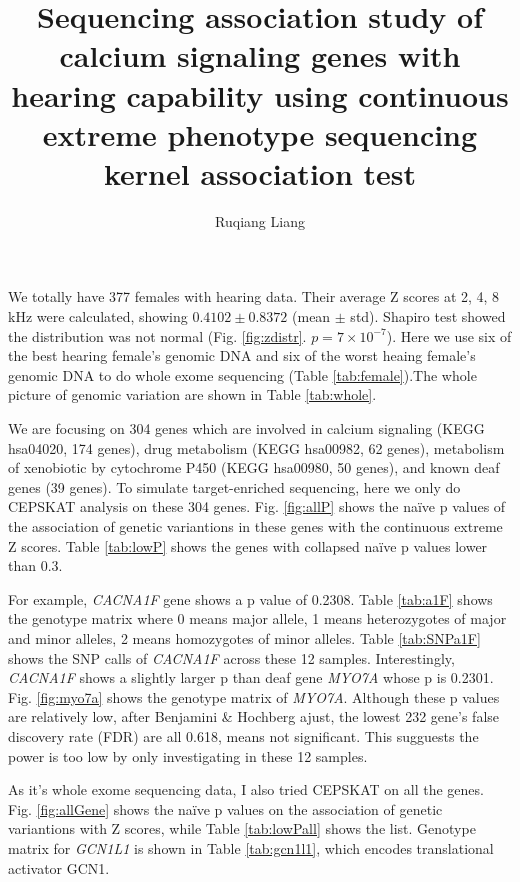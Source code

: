 \documentclass{article}
\begin{document}


\title{Sequencing association study of calcium signaling genes with hearing capability using continuous extreme phenotype sequencing kernel association test}
\author{Ruqiang Liang}
\maketitle

We totally have 377 females with hearing data. Their average Z scores at 2, 4, 8 kHz were calculated, showing $0.4102 \pm 0.8372$ (mean $\pm$ std). Shapiro test showed the distribution was not normal (Fig. \ref{fig:zdistr}. $p = 7 \times 10^{-7}$). Here we use six of the best hearing female's genomic DNA and six of the worst heaing female's genomic DNA to do whole exome sequencing (Table \ref{tab:female}).The whole picture of genomic variation are shown in Table \ref{tab:whole}.

We are focusing on 304 genes which are involved in calcium signaling (KEGG hsa04020, 174 genes), drug metabolism (KEGG hsa00982, 62 genes), metabolism of xenobiotic by cytochrome P450 (KEGG hsa00980, 50 genes), and known deaf genes (39 genes). To simulate target-enriched sequencing, here we only do CEPSKAT analysis on these 304 genes. Fig. \ref{fig:allP} shows the na\"ive p values of the association of genetic variantions in these genes with the continuous extreme Z scores. Table \ref{tab:lowP} shows the genes with collapsed na\"ive p values lower than 0.3. 

For example, {\it CACNA1F} gene shows a p value of 0.2308. Table \ref{tab:a1F} shows the genotype matrix where 0 means major allele, 1 means heterozygotes of major and minor alleles, 2 means homozygotes of minor alleles. Table \ref{tab:SNPa1F} shows the SNP calls of {\it CACNA1F} across these 12 samples. Interestingly, {\it CACNA1F} shows  a slightly larger p than deaf gene {\it MYO7A} whose p is 0.2301. Fig. \ref{fig:myo7a} shows the genotype matrix of {\it MYO7A}. Although these p values are relatively low, after Benjamini \& Hochberg ajust, the lowest 232 gene's false discovery rate (FDR) are all 0.618, means not significant. This sugguests the power is too low by only investigating in these 12 samples.

As it's whole exome sequencing data, I also tried CEPSKAT on all the genes. Fig. \ref{fig:allGene} shows the na\"ive p values on the association of genetic variantions with Z scores, while Table \ref{tab:lowPall} shows the list. Genotype matrix for {\it GCN1L1} is shown in Table \ref{tab:gcn1l1}, which encodes translational activator GCN1.
\end{document}
